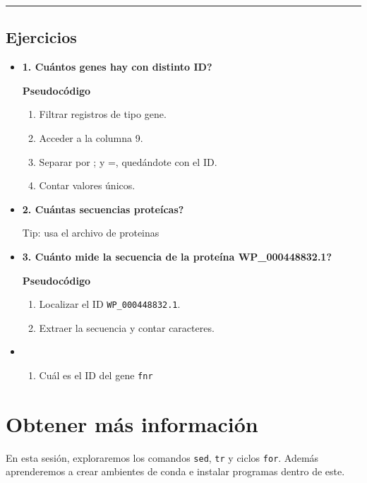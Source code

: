 \documentclass[
]{book}
\providecommand{\tightlist}{%
  \setlength{\itemsep}{0pt}\setlength{\parskip}{0pt}}
\begin{document}
\begin{center}\rule{0.5\linewidth}{0.5pt}\end{center}

\section{Ejercicios}\label{ejercicios}

\begin{itemize}
\item
  \textbf{1. Cuántos genes hay con distinto ID?}

  \textbf{Pseudocódigo}

  \begin{enumerate}
  \def\labelenumi{\arabic{enumi}.}
  \item
    Filtrar registros de tipo gene.
  \item
    Acceder a la columna 9.
  \item
    Separar por ; y =, quedándote con el ID.
  \item
    Contar valores únicos.
  \end{enumerate}
\item
  \textbf{2. Cuántas secuencias proteícas?}

  Tip: usa el archivo de proteinas
\item
  \textbf{3. Cuánto mide la secuencia de la proteína WP\_000448832.1?}

  \textbf{Pseudocódigo}

  \begin{enumerate}
  \def\labelenumi{\arabic{enumi}.}
  \item
    Localizar el ID \texttt{WP\_000448832.1}.
  \item
    Extraer la secuencia y contar caracteres.
  \end{enumerate}
\item
  \begin{enumerate}
  \def\labelenumi{\arabic{enumi}.}
  \setcounter{enumi}{3}
  \tightlist
  \item
    Cuál es el ID del gene \texttt{fnr}
  \end{enumerate}
\end{itemize}

\chapter{Obtener más información}\label{obtener-muxe1s-informaciuxf3n}

En esta sesión, exploraremos los comandos \texttt{sed}, \texttt{tr} y ciclos \texttt{for}. Además aprenderemos a crear ambientes de conda e instalar programas dentro de este.
\end{document}
